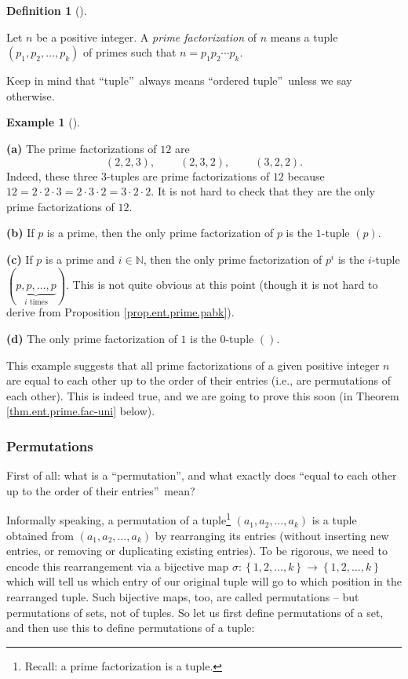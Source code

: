 \documentclass[numbers=enddot,12pt,final,onecolumn,notitlepage]{scrartcl}%
\numberwithin{exer}{subsection}
\theoremstyle{definition}
\newtheorem{defi}[theo]{Definition}
\newenvironment{definition}[1][]
{\begin{defi}[#1]\begin{leftbar}}
{\end{leftbar}\end{defi}}
\newtheorem{exam}[theo]{Example}
\newenvironment{example}[1][]
{\begin{exam}[#1]\begin{leftbar}}
{\end{leftbar}\end{exam}}
\begin{document}
\begin{definition}
Let $n$ be a positive integer. A \textit{prime factorization} of $n$ means a
tuple $\left(  p_{1},p_{2},\ldots,p_{k}\right)  $ of primes such that
$n=p_{1}p_{2}\cdots p_{k}$.
\end{definition}

Keep in mind that \textquotedblleft tuple\textquotedblright\ always means
\textquotedblleft ordered tuple\textquotedblright\ unless we say otherwise.

\begin{example}
\textbf{(a)} The prime factorizations of $12$ are%
\[
\left(  2,2,3\right)  ,\ \ \ \ \ \ \ \ \ \ \left(  2,3,2\right)
,\ \ \ \ \ \ \ \ \ \ \left(  3,2,2\right)  .
\]
Indeed, these three $3$-tuples are prime factorizations of $12$ because
$12=2\cdot2\cdot3=2\cdot3\cdot2=3\cdot2\cdot2$. It is not hard to check that
they are the only prime factorizations of $12$.

\textbf{(b)} If $p$ is a prime, then the only prime factorization of $p$ is
the $1$-tuple $\left(  p\right)  $.

\textbf{(c)} If $p$ is a prime and $i\in\mathbb{N}$, then the only prime
factorization of $p^{i}$ is the $i$-tuple $\left(  \underbrace{p,p,\ldots
,p}_{i\text{ times}}\right)  $. This is not quite obvious at this point
(though it is not hard to derive from Proposition \ref{prop.ent.prime.pabk}).

\textbf{(d)} The only prime factorization of $1$ is the $0$-tuple $\left(
{}\right)  $.
\end{example}

This example suggests that all prime factorizations of a given positive
integer $n$ are equal to each other up to the order of their entries (i.e.,
are permutations of each other). This is indeed true, and we are going to
prove this soon (in Theorem \ref{thm.ent.prime.fac-uni} below).

\subsubsection{Permutations}

First of all: what is a \textquotedblleft permutation\textquotedblright, and
what exactly does \textquotedblleft equal to each other up to the order of
their entries\textquotedblright\ mean?

Informally speaking, a permutation of a tuple\footnote{Recall: a prime
factorization is a tuple.} $\left(  a_{1},a_{2},\ldots,a_{k}\right)  $ is a
tuple obtained from $\left(  a_{1},a_{2},\ldots,a_{k}\right)  $ by rearranging
its entries (without inserting new entries, or removing or duplicating
existing entries). To be rigorous, we need to encode this rearrangement via a
bijective map $\sigma:\left\{  1,2,\ldots,k\right\}  \rightarrow\left\{
1,2,\ldots,k\right\}  $ which will tell us which entry of our original tuple
will go to which position in the rearranged tuple. Such bijective maps, too,
are called permutations -- but permutations of sets, not of tuples. So let us
first define permutations of a set, and then use this to define permutations
of a tuple:
\end{document}
